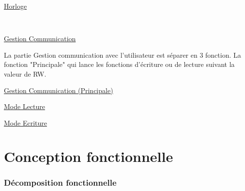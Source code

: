 \documentclass[11pt, french]{article} %
\begin{document}
\vspace{0.2in}
\underline{Horloge}

\begin{minipage}[t, h]{8cm}

\end{minipage}
~
\begin{minipage}[t, h]{8cm}

\end{minipage}


\underline{Gestion Communication}
\vspace{0.2in}

La partie Gestion communication avec l'utilisateur est séparer en 3 fonction. La fonction "Principale" qui lance les fonctions d'écriture ou de lecture suivant la valeur de RW.

%
%

\vspace{0.2in}
\hspace{0.2in}
\underline{Gestion Communication (Principale)}

\begin{center}

\end{center}

\pagebreak
\begin{landscape}

\hspace{0.2in}
\underline{Mode Lecture}

\begin{center}

\end{center}

\hspace{0.2in}
\vspace{0.2in}
\underline{Mode Ecriture}

\begin{center}

\end{center}
\end{landscape}

\part{Conception fonctionnelle}
\section{Décomposition fonctionnelle}

\begin{center}
\begin{turn}{90}

\end{turn}
\end{center}
\end{document}
